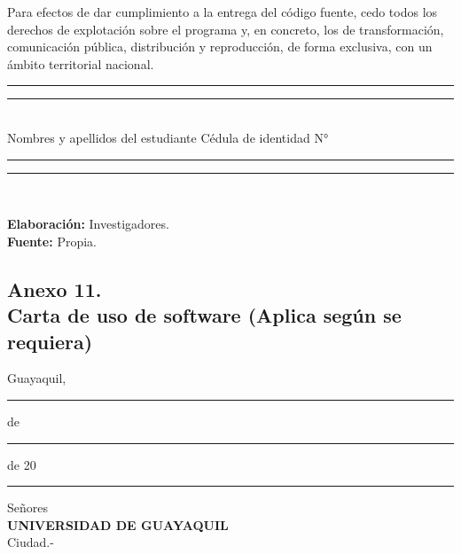 \documentclass[12pt, a4paper, nofontenc, numbers=endperiod]{apa7}
\begin{document}
{\setlength{\parindent}{1.27cm}Para efectos de dar cumplimiento a la entrega del código fuente, cedo todos los derechos de explotación sobre el programa y, en concreto, los de transformación, comunicación pública, distribución y reproducción, de forma exclusiva, con un ámbito territorial nacional.

\begin{center}
	\vspace*{1cm}
	\singlespacing\rule[0mm]{68mm}{0.1mm} \hspace*{1.8cm} \rule[0mm]{58mm}{0.1mm}\\
	\hspace*{-0.1cm}Nombres y apellidos del estudiante
	\hspace*{3.4cm} Cédula de identidad N°
	
	\vspace*{1cm}
	{\color{red}\rule[0mm]{68mm}{0.1mm}} \hspace*{1.8cm} {\color{red}\rule[0mm]{58mm}{0.1mm}}\\
\end{center}

\vspace*{2cm}
\begin{center}
	\singlespacing\textbf{Elaboración:} Investigadores.\\
	\textbf{Fuente:} Propia.
\end{center}


\newpage
\subsection*{\normalsize \centering Anexo 11. \\ Carta de uso de software (Aplica según se requiera)}


\begin{flushright}
	Guayaquil, \rule[0mm]{10mm}{0.1mm} de \rule[0mm]{10mm}{0.1mm} de 20 \rule[0mm]{10mm}{0.1mm}
\end{flushright}

\setlength{\parindent}{0cm}Señores\\
\textbf{UNIVERSIDAD DE GUAYAQUIL} \\
Ciudad.- \\

}
\end{document}
